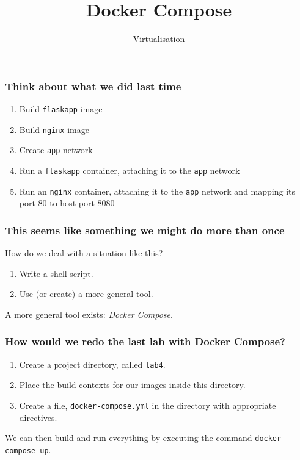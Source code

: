 \documentclass[10pt]{beamer}
\title{Docker Compose}
\author[I720]{Virtualisation}
\institute[Otago Polytechnic]{
  Otago Polytechnic \\
  Dunedin, New Zealand \\
}
\date{}
\begin{document}
\begin{frame}[plain]
  \titlepage
\end{frame}

\begin{frame}
  \frametitle{Think about what we did last time}
  
  \begin{enumerate}
    \item Build \texttt{flaskapp} image
    \item Build \texttt{nginx} image
    \item Create \texttt{app} network
    \item Run a \texttt{flaskapp} container, attaching it to the \texttt{app} network
    \item Run an \texttt{nginx} container, attaching it to the \texttt{app} network and mapping its port 80 to host port 8080
  \end{enumerate}
\end{frame}

\begin{frame}
  \frametitle{This seems like something we might do more than once}
  
   How do we deal with a situation like this?
   
   \begin{enumerate}
     \item Write a shell script.
     \item Use (or create) a more general tool.
   \end{enumerate}
   
   A more general tool exists: \emph{Docker Compose}.

\end{frame}

\begin{frame}
  \frametitle{How would we redo the last lab with Docker Compose?}
   
   \begin{enumerate}
     \item Create a project directory, called \texttt{lab4}.
     \item Place the build contexts for our images inside this directory.
     \item Create a file, \texttt{docker-compose.yml} in the directory with appropriate directives.
   \end{enumerate}
   
   We can then build and run everything by executing the command \texttt{docker-compose up}.

\end{frame}
\end{document}
